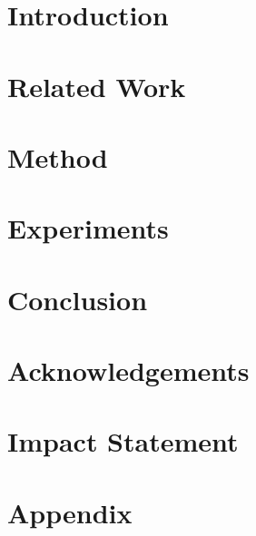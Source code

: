 \documentclass{article}
\theoremstyle{plain}
\theoremstyle{definition}
\theoremstyle{remark}
\begin{document}

\printAffiliationsAndNotice{}

\begin{abstract}
\end{abstract}

\section{Introduction}
\label{sec:intro}

\section{Related Work}
\label{sec:related}

\section{Method}
\label{sec:method}

\section{Experiments}
\label{sec:experiments}

\section{Conclusion}
\label{sec:conclusion}

\section*{Acknowledgements}

\section*{Impact Statement}




\newpage
\appendix
\onecolumn
\section{Appendix}
\end{document}
